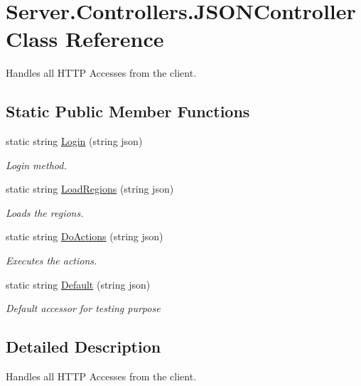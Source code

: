 \hypertarget{classServer_1_1Controllers_1_1JSONController}{}\section{Server.\+Controllers.\+J\+S\+O\+N\+Controller Class Reference}
\label{classServer_1_1Controllers_1_1JSONController}


Handles all H\+T\+T\+P Accesses from the client.  


\subsection*{Static Public Member Functions}
\begin{DoxyCompactItemize}
\item 
static string \hyperlink{classServer_1_1Controllers_1_1JSONController_a52dc525f99280f97880f643cc4a7ee15}{Login} (string json)
\begin{DoxyCompactList}\small\item\em Login method. \end{DoxyCompactList}\item 
static string \hyperlink{classServer_1_1Controllers_1_1JSONController_a0c24ca6628de5a60fb6b9900d358e5b0}{Load\+Regions} (string json)
\begin{DoxyCompactList}\small\item\em Loads the regions. \end{DoxyCompactList}\item 
static string \hyperlink{classServer_1_1Controllers_1_1JSONController_ab7558985d57b1fac5d9973de7dd0bf57}{Do\+Actions} (string json)
\begin{DoxyCompactList}\small\item\em Executes the actions. \end{DoxyCompactList}\item 
static string \hyperlink{classServer_1_1Controllers_1_1JSONController_a151084ee555fe5f62c584263905393c6}{Default} (string json)
\begin{DoxyCompactList}\small\item\em Default accessor for testing purpose \end{DoxyCompactList}\end{DoxyCompactItemize}


\subsection{Detailed Description}
Handles all H\+T\+T\+P Accesses from the client. 



